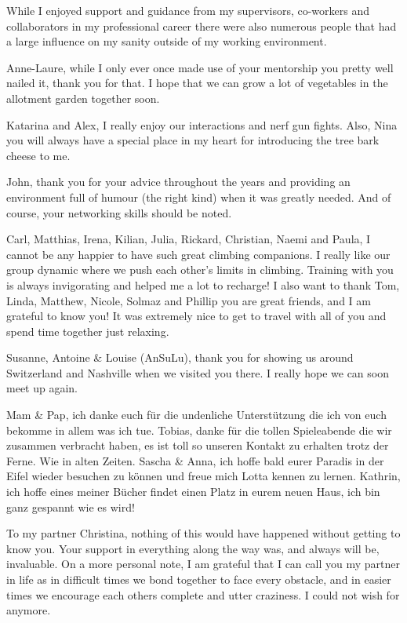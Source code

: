 \documentclass[12pt,openany]{book}
\begin{document}
While I enjoyed support and guidance from my supervisors, co-workers and
collaborators in my professional career there were also numerous people
that had a large influence on my sanity outside of my working
environment.

Anne-Laure, while I only ever once made use of your mentorship you
pretty well nailed it, thank you for that. I hope that we can grow a lot
of vegetables in the allotment garden together soon.

Katarina and Alex, I really enjoy our interactions and nerf gun fights.
Also, Nina you will always have a special place in my heart for
introducing the tree bark cheese to me.

John, thank you for your advice throughout the years and providing an
environment full of humour (the right kind) when it was greatly needed.
And of course, your networking skills should be noted.

Carl, Matthias, Irena, Kilian, Julia, Rickard, Christian, Naemi and
Paula, I cannot be any happier to have such great climbing companions. I
really like our group dynamic where we push each other's limits in
climbing. Training with you is always invigorating and helped me a lot
to recharge! I also want to thank Tom, Linda, Matthew, Nicole, Solmaz
and Phillip you are great friends, and I am grateful to know you! It was
extremely nice to get to travel with all of you and spend time together
just relaxing.

Susanne, Antoine \& Louise (AnSuLu), thank you for showing us around
Switzerland and Nashville when we visited you there. I really hope we
can soon meet up again.

Mam \& Pap, ich danke euch für die undenliche Unterstützung die ich von
euch bekomme in allem was ich tue. Tobias, danke für die tollen
Spieleabende die wir zusammen verbracht haben, es ist toll so unseren
Kontakt zu erhalten trotz der Ferne. Wie in alten Zeiten. Sascha \&
Anna, ich hoffe bald eurer Paradis in der Eifel wieder besuchen zu
können und freue mich Lotta kennen zu lernen. Kathrin, ich hoffe eines
meiner Bücher findet einen Platz in eurem neuen Haus, ich bin ganz
gespannt wie es wird!

To my partner Christina, nothing of this would have happened without
getting to know you. Your support in everything along the way was, and
always will be, invaluable. On a more personal note, I am grateful that
I can call you my partner in life as in difficult times we bond together
to face every obstacle, and in easier times we encourage each others
complete and utter craziness. I could not wish for anymore.
\end{document}
